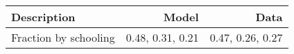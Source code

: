 \begin{tabular}{lrr}
\hline
Description & Model  & Data  \\ 
\hline
Fraction by schooling & 0.48, 0.31, 0.21  & 0.47, 0.26, 0.27  \\ 
\hline
\end{tabular}%
